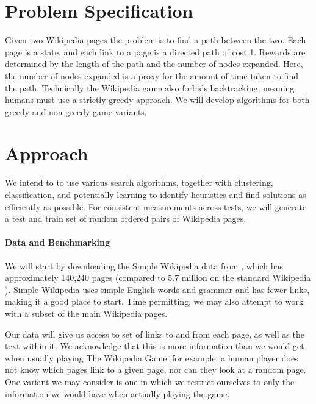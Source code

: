\documentclass[11pt]{article}
\begin{document}
\section{Problem Specification}

Given two Wikipedia pages the problem is to find a path between the two. Each page is a state, and each link to a page is a directed path of cost 1. Rewards are determined by the length of the path and the number of nodes expanded.  Here, the number of nodes expanded is a proxy for the amount of time taken to find the path. Technically the Wikipedia game also forbids backtracking, meaning humans must use a strictly greedy approach. We will develop algorithms for both greedy and non-greedy game variants.

 \section{Approach}

We intend to to use various search algorithms, together with clustering, classification, and potentially learning to identify heuristics and find solutions as efficiently as possible.  For consistent measurements across tests, we will generate a test and train set of random ordered pairs of Wikipedia pages.

\paragraph{Data and Benchmarking}
We will start by downloading the Simple Wikipedia data from \cite{data}, which has approximately 140,240 pages (compared to 5.7 million on the standard Wikipedia \cite{sizeofwiki}). Simple Wikipedia uses simple English words and grammar and has fewer links, making it a good place to start. Time permitting, we may also attempt to work with a subset of the main Wikipedia pages. 

Our data will give us access to set of links to and from each page, as well as the text within it. We acknowledge that this is more information than we would get when usually playing The Wikipedia Game; for example, a human player does not know which pages link to a given page, nor can they look at a random page.  One variant we may consider is one  in which we restrict ourselves to only the information we would have when actually playing the game.
\end{document}
